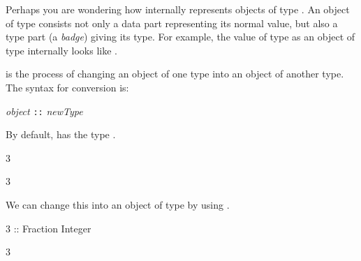 Perhaps you are wondering how \Language{} internally represents
objects of type .
An object of type  consists not only a data part
representing its normal value, but also a type part (a {\it badge}) giving
its type.
For example, the value  of type  as an
object of type  internally looks like
\spad{[1,PositiveInteger()]}.


%
\beginImportant
{}
is the process of changing an object of one type
into an object of another type.
The syntax for conversion is:
\begin{center}
{\it object} {\tt ::} {\it newType}
\end{center}
\endImportant

\begin{xtc}
\begin{xtccomment}
By default,  has the type .
\end{xtccomment}
\begin{spadsrc}
3
\end{spadsrc}
\begin{TeXOutput}
\begin{fricasmath}{1}
3%
\end{fricasmath}
\end{TeXOutput}
\end{xtc}
\begin{xtc}
\begin{xtccomment}
We can change this into an object of type 
by using \spadSyntax{::}.
\end{xtccomment}
\begin{spadsrc}
3 :: Fraction Integer
\end{spadsrc}
\begin{TeXOutput}
\begin{fricasmath}{2}
3%
\end{fricasmath}
\end{TeXOutput}
\end{xtc}


